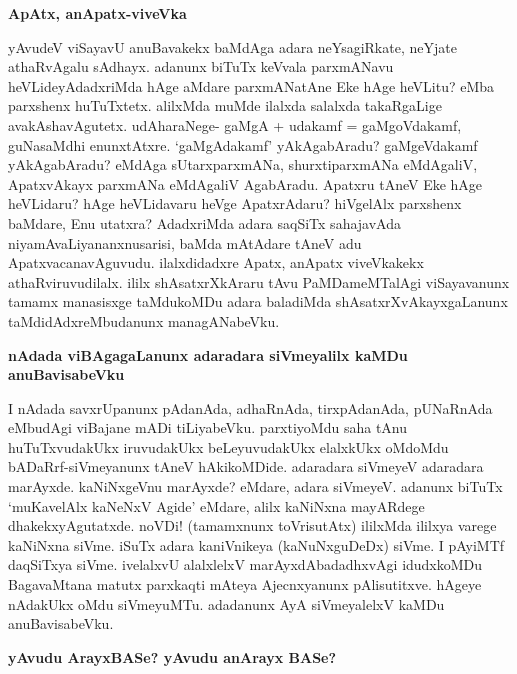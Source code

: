 {\bigskip
\noindent
{\large\bf ApAtx, anApatx-viveVka}}\label{page173}
\medskip

\noindent
yAvudeV viSayavU anuBavakekx baMdAga adara neYsagiRkate, neYjate athaR\-vAgalu sAdhayx. adanunx biTuTx keVvala parxmANavu heVLideyAdadxriMda hAge aMdare parxmANatAne Eke hAge heVLitu? eMba parxshenx huTuTxtetx. alilxMda muMde ilalxda salalxda takaRgaLige avakAshavAgutetx. udAharaNege- gaMgA + udakamf =\- gaMgoVdakamf, guNasaMdhi enunxtAtxre. `gaMgAdakamf' yAkAgabAradu? gaMgeVdakamf yAkAgabAradu? eMdAga sUtarxparxmANa, shurxtiparxmANa eMdAgaliV, ApatxvAkayx parxmANa eMdAgaliV AgabAradu. Apatxru tAneV Eke hAge heVLidaru? hAge heVLidavaru heVge ApatxrAdaru? hiVgelAlx parxshenx baMdare, Enu utatxra? AdadxriMda adara saqSiTx sahajavAda niyamAvaLiyananxnusarisi, baMda mAtAdare tAneV adu Apatxvacana\-vAguvudu. ilalxdidadxre Apatx, anApatx viveVkakekx athaRviruvudilalx. ililx shAsatxrXkAraru tAvu PaMDameMTa\-lAgi viSayavanunx tamamx manasisxge taMdukoMDu adara baladiMda shAsatxrXvAkayxgaLanunx taMdidAdxreMbu\-danunx managANabeVku.

{\bigskip
\noindent
{\large\bf nAdada viBAgagaLanunx adaradara siVmeyalilx kaMDu anuBavisabeVku}}
\medskip

\noindent
I nAdada savxrUpanunx pAdanAda, adhaRnAda, tirxpAdanAda, pUNaRnAda eMbudAgi viBajane mADi tiLiyabeVku. parxtiyoMdu saha tAnu huTuTxvudakUkx iruvudakUkx beLeyuvudakUkx elalxkUkx oMdoMdu bADaRrf-siVmeyanunx tAneV hAkikoMDide. adaradara siVmeyeV adaradara marAyxde. kaNiNxgeVnu marAyxde? eMdare, adara siVmeyeV. adanunx biTuTx `muKavelAlx kaNeNxV Agide' eMdare, alilx kaNiNxna mayARdege dhakekxyAgutatxde. noVDi! (tamamxnunx toVrisutAtx) ililxMda ililxya varege kaNiNxna siVme. iSuTx adara kaniVnikeya (kaNuNxguDeDx) siVme. I pAyiMTf daqSiTxya siVme. ivelalxvU alalxlelxV marAyxdAbadadhxvAgi idudxkoMDu BagavaMtana matutx parxkaqti mAteya Ajecnxyanunx pAlisutitxve. hAgeye nAdakUkx oMdu siVmeyuMTu. adadanunx AyA siVmeyalelxV kaMDu anuBavisabeVku.

{\bigskip
\noindent
{\large\bf yAvudu ArayxBASe? yAvudu anArayx BASe?}}\label{page174}
\medskip

